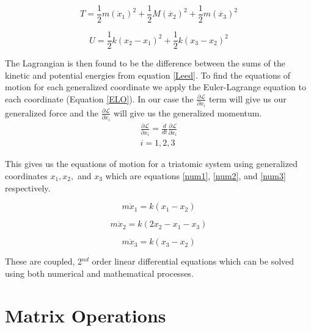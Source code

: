 \documentclass[hidelinks]{article}
\begin{document}
\begin{multicols}{2}
\begin{equation}
\label{kinetic}
T= \frac{1}{2}m(\dot{x}_1)^2+\frac{1}{2}M(\dot{x_2})^2+\frac{1}{2}m(\dot{x_3})^2
\end{equation}

\begin{equation}
U=\frac{1}{2}k(x_2-x_1)^2+\frac{1}{2}k(x_3-x_2)^2
\label{potential}
\end{equation}

The Lagrangian is then found to be the difference between the sums of the kinetic and potential energies from equation \ref{Leed}. To find the equations of motion for each generalized coordinate we apply the Euler-Lagrange equation to each coordinate (Equation \ref{ELO}). In our case the $\frac{\partial \mathcal{L}}{\partial x_i}$ term will give us our generalized force and the $\frac{\partial \mathcal{L}}{\partial \dot{x}_i}$ will give us the generalized momentum.
\begin{equation}
\begin{split}
\frac{\partial \mathcal{L}}{\partial x_i}=\frac{d}{dt}\frac{\partial \mathcal{L}}{\partial \dot{x}_i} \\
i = 1,2,3
\end{split}
\label{ELO}
\end{equation} 

This gives us the equations of motion for a triatomic system using generalized coordinates $x_1, x_2,$ and $ x_3$ which are equations \ref{num1}, \ref{num2}, and \ref{num3} respectively. 

\begin{equation}
\label{num1}
m\ddot{x}_1=k(x_1-x_2) 
\end{equation}

\begin{equation}
\label{num2}
m\ddot{x}_2=k(2x_2-x_1-x_3)
\end{equation}

\begin{equation}
\label{num3}
m\ddot{x}_3=k(x_3-x_2)
\end{equation}

These are coupled, 2$^{nd}$ order linear differential equations which can be solved using both numerical and mathematical processes.



\section{Matrix Operations}


\end{multicols}
\end{document}
